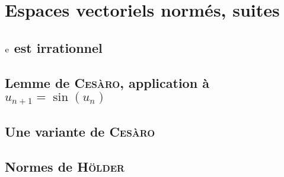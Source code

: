 \chapter{Espaces vectoriels normés, suites}

\section{\texorpdfstring{$\mathrm{e}$}{e} est irrationnel}


\section{Lemme de \textsc{Cesàro}, application à \texorpdfstring{$u_{n+1}=\sin(u_n)$}{u_n+1 = sin(u_n)}}


\section{Une variante de \textsc{Cesàro}}


\section{Normes de \textsc{Hölder}}



